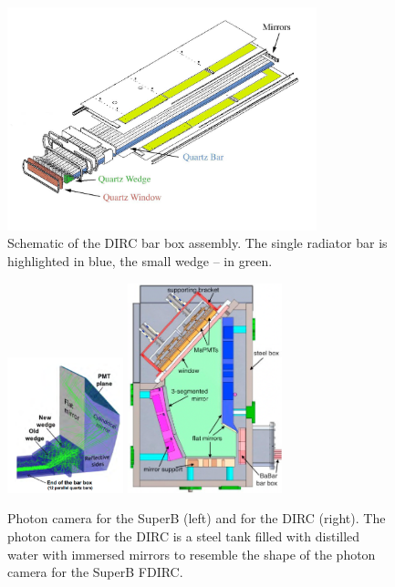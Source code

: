 \begin{figure}[!h]
\centering
\includegraphics[width=0.8\textwidth]{pics/bab_col.jpg}
\caption{\label{pic:bbox} Schematic of the \babar DIRC bar box assembly. The single radiator bar is highlighted in blue, the small wedge -- in green.}
\end{figure}

\begin{figure}[!h]
\begin{center}
\includegraphics[width=0.3\textwidth]{pics/superB.png} \hspace{0.5cm} \includegraphics[width=0.4\textwidth]{pics/pc.png}
\end{center}
\caption{\label{pic:ob} Photon camera for the SuperB (left) and for the \gluex DIRC (right). The photon camera for the \gluex DIRC is a steel tank filled with distilled water with immersed mirrors to resemble the shape of the photon camera for the SuperB FDIRC.}
\end{figure}

